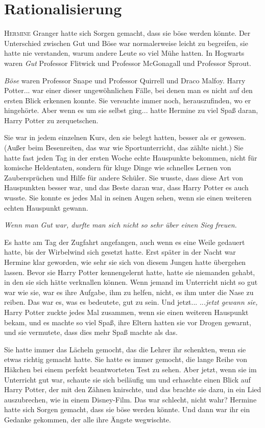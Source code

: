 \chapter{Rationalisierung}

\lettrine{H}{ermine} Granger hatte sich Sorgen gemacht, dass sie böse werden
könnte. Der Unterschied zwischen Gut und Böse war normalerweise leicht zu
begreifen, sie hatte nie verstanden, warum andere Leute so viel Mühe hatten. In
Hogwarts waren \glqq \emph{Gut}\grqq{} Professor Flitwick und Professor
McGonagall und Professor Sprout.

\glqq \emph{Böse}\grqq{} waren Professor Snape und Professor Quirrell und Draco
Malfoy. Harry Potter... war einer dieser ungewöhnlichen Fälle, bei denen man es
nicht auf den ersten Blick erkennen konnte. Sie versuchte immer noch,
herauszufinden, wo er hingehörte. Aber wenn es um sie selbst ging... hatte
Hermine zu viel Spaß daran, Harry Potter zu zerquetschen.

Sie war in jedem einzelnen Kurs, den sie belegt hatten, besser als er gewesen.
(Außer beim Besenreiten, das war wie Sportunterricht, das zählte nicht.) Sie
hatte fast jeden Tag in der ersten Woche echte Hauspunkte bekommen, nicht für
komische Heldentaten, sondern für kluge Dinge wie schnelles Lernen von
Zaubersprüchen und Hilfe für andere Schüler. Sie wusste, dass diese Art von
Hauspunkten besser war, und das Beste daran war, dass Harry Potter es auch
wusste. Sie konnte es jedes Mal in seinen Augen sehen, wenn sie einen weiteren
echten Hauspunkt gewann.

\emph{Wenn man Gut war, durfte man sich nicht so sehr über einen Sieg freuen.}

Es hatte am Tag der Zugfahrt angefangen, auch wenn es eine Weile gedauert hatte,
bis der Wirbelwind sich gesetzt hatte. Erst später in der Nacht war Hermine klar
geworden, wie sehr sie sich von diesem Jungen hatte übergehen lassen. Bevor sie
Harry Potter kennengelernt hatte, hatte sie niemanden gehabt, in den sie sich
hätte verknallen können. Wenn jemand im Unterricht nicht so gut war wie sie, war
es ihre Aufgabe, ihm zu helfen, nicht, es ihm unter die Nase zu reiben. Das war
es, was es bedeutete, gut zu sein. Und jetzt... ..\emph{.jetzt gewann sie,}
Harry Potter zuckte jedes Mal zusammen, wenn sie einen weiteren Hauspunkt bekam,
und es machte so viel Spaß, ihre Eltern hatten sie vor Drogen gewarnt, und sie
vermutete, dass dies mehr Spaß machte als das.

Sie hatte immer das Lächeln gemocht, das die Lehrer ihr schenkten, wenn sie
etwas richtig gemacht hatte. Sie hatte es immer gemocht, die lange Reihe von
Häkchen bei einem perfekt beantworteten Test zu sehen. Aber jetzt, wenn sie im
Unterricht gut war, schaute sie sich beiläufig um und erhaschte einen Blick auf
Harry Potter, der mit den Zähnen knirschte, und das brachte sie dazu, in ein
Lied auszubrechen, wie in einem Disney-Film. Das war schlecht, nicht wahr?
Hermine hatte sich Sorgen gemacht, dass sie böse werden könnte. Und dann war ihr
ein Gedanke gekommen, der alle ihre Ängste wegwischte.

